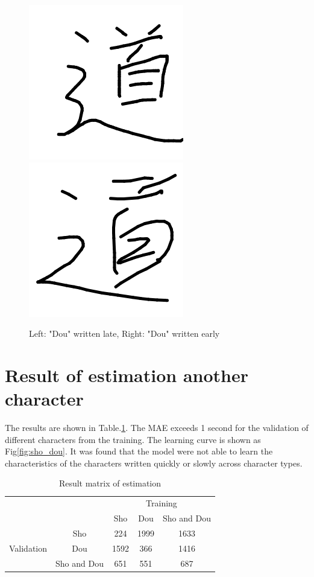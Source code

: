 \documentclass[10pt,twocolumn,letterpaper]{article}
\begin{document}
\begin{figure}[h]
    \begin{center}
        \includegraphics[width=0.4\linewidth]{images/U9053_00002.png}
        \includegraphics[width=0.4\linewidth]{images/U9053_00034.png}
    \end{center}
    \caption{Left: "Dou" written late, Right: "Dou" written early}
    \label{fig:dou}
\end{figure}

\section{Result of estimation another character}
The results are shown in Table.\ref{table:result_matrix}.
The MAE exceeds 1 second for the validation of different characters from the training.
The learning curve is shown as Fig\ref{fig:sho_dou}.
It was found that the model were not able to learn the characteristics of the characters written quickly or slowly across character types.

\begin{table}[h]
    \begin{center}
        \begin{tabular}{|c|c|ccc|}\hline
            \multicolumn{2}{|c|}{} & \multicolumn{3}{c|}{Training}                             \\
            \cline{3-5}
            \multicolumn{2}{|c|}{} & Sho                           & Dou  & Sho and Dou        \\ \hline
                                   & Sho                           & 224  & 1999        & 1633 \\
            Validation             & Dou                           & 1592 & 366         & 1416 \\
                                   & Sho and Dou                   & 651  & 551         & 687  \\ \hline
        \end{tabular}
    \end{center}
    \caption{Result matrix of estimation}
    \label{table:result_matrix}
\end{table}
\end{document}
